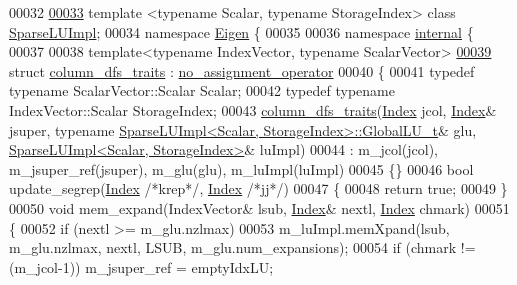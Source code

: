 \begin{DoxyCode}
00032 
\hyperlink{class_sparse_l_u_impl}{00033} \textcolor{keyword}{template} <\textcolor{keyword}{typename} Scalar, \textcolor{keyword}{typename} StorageIndex> \textcolor{keyword}{class }\hyperlink{class_sparse_l_u_impl}{SparseLUImpl};
00034 \textcolor{keyword}{namespace }\hyperlink{namespace_eigen}{Eigen} \{
00035 
00036 \textcolor{keyword}{namespace }\hyperlink{namespaceinternal}{internal} \{
00037 
00038 \textcolor{keyword}{template}<\textcolor{keyword}{typename} IndexVector, \textcolor{keyword}{typename} ScalarVector>
\hyperlink{struct_eigen_1_1internal_1_1column__dfs__traits}{00039} \textcolor{keyword}{struct }\hyperlink{struct_eigen_1_1internal_1_1column__dfs__traits}{column\_dfs\_traits} : \hyperlink{class_eigen_1_1internal_1_1no__assignment__operator}{no\_assignment\_operator}
00040 \{
00041   \textcolor{keyword}{typedef} \textcolor{keyword}{typename} ScalarVector::Scalar Scalar;
00042   \textcolor{keyword}{typedef} \textcolor{keyword}{typename} IndexVector::Scalar StorageIndex;
00043   \hyperlink{struct_eigen_1_1internal_1_1column__dfs__traits}{column\_dfs\_traits}(\hyperlink{namespace_eigen_a62e77e0933482dafde8fe197d9a2cfde}{Index} jcol, \hyperlink{namespace_eigen_a62e77e0933482dafde8fe197d9a2cfde}{Index}& jsuper, \textcolor{keyword}{typename} 
      \hyperlink{struct_eigen_1_1internal_1_1_l_u___global_l_u__t}{SparseLUImpl<Scalar, StorageIndex>::GlobalLU\_t}& glu, 
      \hyperlink{group___sparse_l_u___module_class_eigen_1_1internal_1_1_sparse_l_u_impl}{SparseLUImpl<Scalar, StorageIndex>}& luImpl)
00044    : m\_jcol(jcol), m\_jsuper\_ref(jsuper), m\_glu(glu), m\_luImpl(luImpl)
00045  \{\}
00046   \textcolor{keywordtype}{bool} update\_segrep(\hyperlink{namespace_eigen_a62e77e0933482dafde8fe197d9a2cfde}{Index} \textcolor{comment}{/*krep*/}, \hyperlink{namespace_eigen_a62e77e0933482dafde8fe197d9a2cfde}{Index} \textcolor{comment}{/*jj*/})
00047   \{
00048     \textcolor{keywordflow}{return} \textcolor{keyword}{true};
00049   \}
00050   \textcolor{keywordtype}{void} mem\_expand(IndexVector& lsub, \hyperlink{namespace_eigen_a62e77e0933482dafde8fe197d9a2cfde}{Index}& nextl, \hyperlink{namespace_eigen_a62e77e0933482dafde8fe197d9a2cfde}{Index} chmark)
00051   \{
00052     \textcolor{keywordflow}{if} (nextl >= m\_glu.nzlmax)
00053       m\_luImpl.memXpand(lsub, m\_glu.nzlmax, nextl, LSUB, m\_glu.num\_expansions); 
00054     \textcolor{keywordflow}{if} (chmark != (m\_jcol-1)) m\_jsuper\_ref = emptyIdxLU;

\end{DoxyCode}
